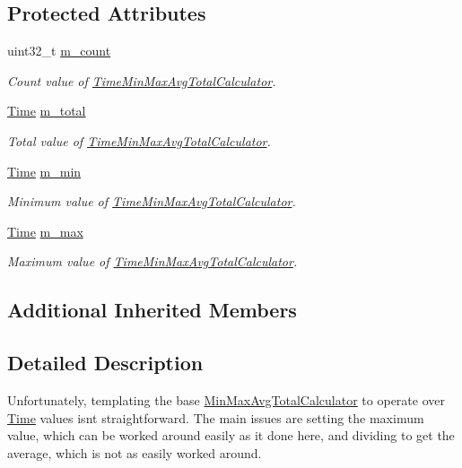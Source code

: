 \subsection*{Protected Attributes}
\begin{DoxyCompactItemize}
\item 
uint32\+\_\+t \hyperlink{classns3_1_1TimeMinMaxAvgTotalCalculator_a6c8fe30f4d4e31413fdb9bab9bfe51d7}{m\+\_\+count}
\begin{DoxyCompactList}\small\item\em Count value of \hyperlink{classns3_1_1TimeMinMaxAvgTotalCalculator}{Time\+Min\+Max\+Avg\+Total\+Calculator}. \end{DoxyCompactList}\item 
\hyperlink{classns3_1_1Time}{Time} \hyperlink{classns3_1_1TimeMinMaxAvgTotalCalculator_a0f72200cefc09c0f04a249723682c6f5}{m\+\_\+total}
\begin{DoxyCompactList}\small\item\em Total value of \hyperlink{classns3_1_1TimeMinMaxAvgTotalCalculator}{Time\+Min\+Max\+Avg\+Total\+Calculator}. \end{DoxyCompactList}\item 
\hyperlink{classns3_1_1Time}{Time} \hyperlink{classns3_1_1TimeMinMaxAvgTotalCalculator_a844eca59dec93d49dfa06397da38ea7d}{m\+\_\+min}
\begin{DoxyCompactList}\small\item\em Minimum value of \hyperlink{classns3_1_1TimeMinMaxAvgTotalCalculator}{Time\+Min\+Max\+Avg\+Total\+Calculator}. \end{DoxyCompactList}\item 
\hyperlink{classns3_1_1Time}{Time} \hyperlink{classns3_1_1TimeMinMaxAvgTotalCalculator_af364c5c25cfa46a37af468c2c63ba79e}{m\+\_\+max}
\begin{DoxyCompactList}\small\item\em Maximum value of \hyperlink{classns3_1_1TimeMinMaxAvgTotalCalculator}{Time\+Min\+Max\+Avg\+Total\+Calculator}. \end{DoxyCompactList}\end{DoxyCompactItemize}
\subsection*{Additional Inherited Members}


\subsection{Detailed Description}
Unfortunately, templating the base \hyperlink{classns3_1_1MinMaxAvgTotalCalculator}{Min\+Max\+Avg\+Total\+Calculator} to operate over \hyperlink{classns3_1_1Time}{Time} values isn\textquotesingle{}t straightforward. The main issues are setting the maximum value, which can be worked around easily as it done here, and dividing to get the average, which is not as easily worked around. 

